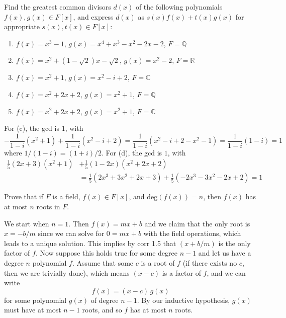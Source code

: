   \begin{exercise}[Shifrin 3.1.2.c/d]
    Find the greatest common divisors $d(x)$ of the following polynomials $f(x), g(x) \in F[x]$, and express $d(x)$ as $s(x)f(x) + t(x)g(x)$ for appropriate $s(x), t(x) \in F[x]$:
    \begin{enumerate}
      \item $f(x) = x^3 - 1$, $g(x) = x^4 + x^3 - x^2 - 2x - 2$, $F = \mathbb{Q}$
      \item $f(x) = x^2 + (1 - \sqrt{2})x - \sqrt{2}$, $g(x) = x^2 - 2$, $F = \mathbb{R}$
      \item $f(x) = x^2 + 1$, $g(x) = x^2 - i + 2$, $F = \mathbb{C}$
      \item $f(x) = x^2 + 2x + 2$, $g(x) = x^2 + 1$, $F = \mathbb{Q}$
      \item $f(x) = x^2 + 2x + 2$, $g(x) = x^2 + 1$, $F = \mathbb{C}$
    \end{enumerate}
  \end{exercise}
  \begin{solution}
    For (c), the gcd is $1$, with 
    \begin{equation} 
      -\frac{1}{1 - i} (x^2 + 1) + \frac{1}{1 - i} (x^2 - i + 2) = \frac{1}{1-i} (x^2 - i + 2 - x^2 - 1) = \frac{1}{1-i} (1 - i) = 1
    \end{equation}
    where $1/(1-i) = (1 + i)/2$. For (d), the gcd is $1$, with 
    \begin{align}
      \frac{1}{5} (2x + 3) (x^2 + 1) & + \frac{1}{5} (1 - 2x) (x^2 + 2x + 2) \\
                                          & = \frac{1}{5} (2x^3 + 3x^2 + 2x + 3) + \frac{1}{5} (-2x^3 - 3x^2 - 2x + 2) = 1
    \end{align}
  \end{solution}

  \begin{exercise}[Shifrin 3.1.6]
    Prove that if $F$ is a field, $f(x) \in F[x]$, and $\mathrm{deg}(f(x)) = n$, then $f(x)$ has at most $n$ roots in $F$. 
  \end{exercise}
  \begin{solution}
    We start when $n=1$. Then $f(x) = mx + b$ and we claim that the only root is $x = -b/m$ since we can solve for $0 = mx + b$ with the field operations, which leads to a unique solution. This implies by corr 1.5 that $(x + b/m)$ is the only factor of $f$. Now suppose this holds true for some degree $n-1$ and let us have a degree $n$ polynomial $f$. Assume that some $c$ is a root of $f$ (if there exists no $c$, then we are trivially done), which means $(x - c)$ is a factor of $f$, and we can write 
    \begin{equation}
      f(x) = (x - c) \, g(x)
    \end{equation}
    for some polynomial $g(x)$ of degree $n-1$. By our inductive hypothesis, $g(x)$ must have at most $n-1$ roots, and so $f$ has at most $n$ roots. 
  \end{solution}

